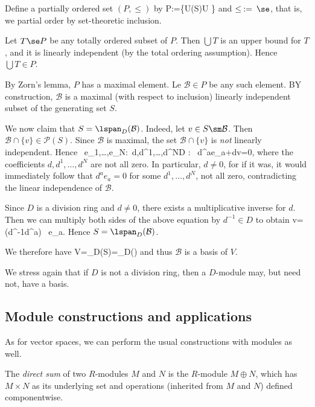 \item Define a partially ordered set $(P,\leq)$ by
\bse
P:=\{U\in {}(S)\mid U \}
\ese
and $\leq\medspace :=\medspace \se$, that is, we partial order by set-theoretic inclusion.
\item Let $T\se P$ be any totally ordered subset of $P$. Then $\bigcup T$ is an upper bound for $T$, and it is linearly independent (by the total ordering assumption). Hence $\bigcup T \in P$.

By Zorn's lemma, $P$ has a maximal element. Le $\mathcal{B}\in P$ be any such element. BY construction, $\mathcal{B}$ is a maximal (with respect to inclusion) linearly independent subset of the generating set $S$.

\item We now claim that $S=\lspan_D(\mathcal{B})$. Indeed, let $v\in S\sm\mathcal{B}$. Then $\mathcal{B}\cap \{v\}\in \mathcal{P}(S)$. Since $\mathcal{B}$ is maximal, the set $\mathcal{B}\cap \{v\}$ is \emph{not} linearly independent. Hence
\bse
\exists\, e_1,\ldots,e_N\in{}:\exists\, d,d^1,\ldots,d^N\in D : \ d^ae_a+dv=0,
\ese
where the coefficients $d,d^1,\ldots,d^N$ are not all zero. In particular, $d\neq 0$, for if it was, it would immediately follow that $d^ae_a=0$ for some $d^1,\ldots,d^N$, not all zero, contradicting the linear independence of $\mathcal{B}$.

Since $D$ is a division ring and $d\neq 0$, there exists a multiplicative inverse for $d$. Then we can multiply both sides of the above equation by $d^{-1}\in D$ to obtain
\bse
v= (d^{-1}\cdot d^a) \, e_a.
\ese
Hence $S=\lspan_D(\mathcal{B})$.
\item We therefore have
\bse
V=\lspan_D(S)=\lspan_D()
\ese
and thus $\mathcal{B}$ is a basis of $V$. \qedhere
\een
\eq

We stress again that if $D$ is not a division ring, then a $D$-module may, but need not, have a basis.

\subsection{Module constructions and applications}

As for vector spaces, we can perform the usual constructions with modules as well.

\bd
The \emph{direct sum} of two $R$-modules $M$ and $N$ is the $R$-module $M\oplus N$, which has $M\times N$ as its underlying set and operations (inherited from $M$ and $N$) defined componentwise. 
\ed

